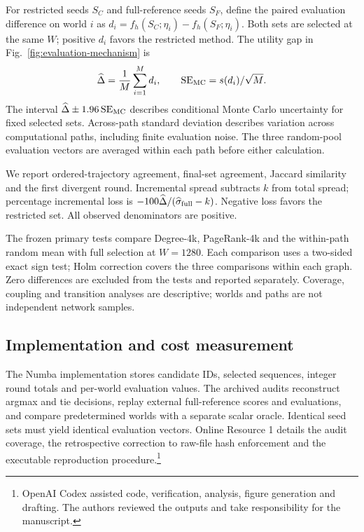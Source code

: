 \documentclass[smallextended]{svjour3}
\begin{document}
For restricted seeds $S_C$ and full-reference seeds $S_F$, define the paired evaluation difference on world $i$ as $d_i=f_h(S_C;\eta_i)-f_h(S_F;\eta_i)$. Both sets are selected at the same $W$; positive $d_i$ favors the restricted method. The utility gap in Fig.~\ref{fig:evaluation-mechanism} is
\begin{equation}
\widehat\Delta=\frac{1}{M}\sum_{i=1}^{M}d_i,
\qquad \operatorname{SE}_{\rm MC}=s(d_i)/\sqrt M.
\end{equation}
The interval $\widehat\Delta\pm1.96\operatorname{SE}_{\rm MC}$ describes conditional Monte Carlo uncertainty for fixed selected sets. Across-path standard deviation describes variation across computational paths, including finite evaluation noise. The three random-pool evaluation vectors are averaged within each path before either calculation.

We report ordered-trajectory agreement, final-set agreement, Jaccard similarity and the first divergent round. Incremental spread subtracts $k$ from total spread; percentage incremental loss is $-100\widehat\Delta/(\widehat\sigma_{\rm full}-k)$. Negative loss favors the restricted set. All observed denominators are positive.

The frozen primary tests compare Degree-4k, PageRank-4k and the within-path random mean with full selection at $W=1280$. Each comparison uses a two-sided exact sign test; Holm correction covers the three comparisons within each graph. Zero differences are excluded from the tests and reported separately. Coverage, coupling and transition analyses are descriptive; worlds and paths are not independent network samples.

\subsection{Implementation and cost measurement}
The Numba implementation stores candidate IDs, selected sequences, integer round totals and per-world evaluation values. The archived audits reconstruct argmax and tie decisions, replay external full-reference scores and evaluations, and compare predetermined worlds with a separate scalar oracle. Identical seed sets must yield identical evaluation vectors. Online Resource 1 details the audit coverage, the retrospective correction to raw-file hash enforcement and the executable reproduction procedure.\footnote{OpenAI Codex assisted code, verification, analysis, figure generation and drafting. The authors reviewed the outputs and take responsibility for the manuscript.}
\end{document}
